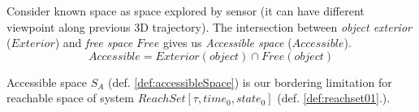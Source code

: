 \begin{definition}\label{def:accessibleSpace}
    Consider known space as space explored by sensor (it can have different viewpoint along previous 3D trajectory).
    The intersection between \textit{object exterior} ($Exterior$) and \textit{free space} $Free$ gives us \textit{Accessible space} ($Accessible$).
    \begin{equation}
        Accessible = Exterior(object) \cap Free(object)
    \end{equation}
\end{definition}
 
 \noindent Accessible space $S_A$ (def. \ref{def:accessibleSpace}) is our bordering limitation for reachable space of system $ReachSet[\tau, time_0, state_0]$ (def. \ref{def:reachset01}.).